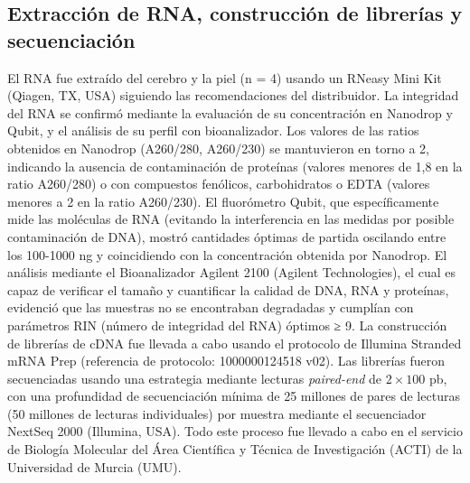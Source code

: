 \documentclass[10pt,a4paper]{article}
\begin{document}
\subsection{Extracción de RNA, construcción de librerías y secuenciación} 
El RNA fue extraído del cerebro y la piel (n = 4) usando un RNeasy Mini Kit (Qiagen, TX, USA) siguiendo las recomendaciones del distribuidor. La integridad del RNA se confirmó mediante la evaluación de su concentración en Nanodrop y Qubit, y el análisis de su perfil con bioanalizador. Los valores de las ratios obtenidos en Nanodrop (A260/280, A260/230) se mantuvieron en torno a 2, indicando la ausencia de contaminación de proteínas (valores menores de 1,8 en la ratio A260/280) o con compuestos fenólicos, carbohidratos o EDTA (valores menores a 2 en la ratio A260/230). El fluorómetro Qubit, que específicamente mide las moléculas de RNA (evitando la interferencia en las medidas por posible contaminación de DNA), mostró cantidades óptimas de partida oscilando entre los 100-1000 ng y coincidiendo con la concentración obtenida por Nanodrop. El análisis mediante el Bioanalizador Agilent 2100 (Agilent Technologies), el cual es capaz de verificar el tamaño y cuantificar la calidad de DNA, RNA y proteínas, evidenció que las muestras no se encontraban degradadas y cumplían con parámetros RIN (número de integridad del RNA) óptimos ≥ 9. La construcción de librerías de cDNA fue llevada a cabo usando el protocolo de Illumina Stranded mRNA Prep (referencia de protocolo: 1000000124518 v02). Las librerías fueron secuenciadas usando una estrategia mediante lecturas \textit{paired-end} de $2 \times 100$ pb, con una profundidad de secuenciación mínima de 25 millones de pares de lecturas (50 millones de lecturas individuales) por muestra mediante el secuenciador NextSeq 2000 (Illumina, USA). Todo este proceso fue llevado a cabo en el servicio de Biología Molecular del Área Científica y Técnica de Investigación (ACTI) de la Universidad de Murcia (UMU).
\newpage
\end{document}
